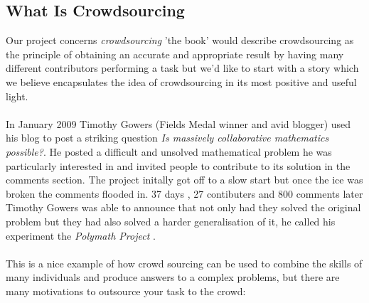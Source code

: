 \documentclass[11pt]{article}
\begin{document}
\subsection{What Is Crowdsourcing} %
Our project concerns \emph{crowdsourcing} 'the book' would describe crowdsourcing as the principle of obtaining an accurate 
and appropriate result by having many different contributors performing a task but we'd like to start with a story which
we believe encapsulates the idea of crowdsourcing in its most positive and useful light.
\\
\\
In January 2009 Timothy Gowers (Fields Medal winner and avid blogger) used his blog to post a striking question \emph{Is massively 
collaborative mathematics possible?}. He posted a difficult and unsolved mathematical problem he was particularly interested in and invited 
people to contribute to its solution in the comments section. The project initally got off to a slow start but once the ice was broken the 
comments flooded in. 37 days , 27 contibuters and 800 comments later Timothy Gowers was able to announce that not only had they solved the 
original problem but they had also solved a harder generalisation of it, he called his experiment the \emph{Polymath Project} .
\\
\\
This is a nice example of how crowd sourcing can be used to combine the skills of many individuals and produce answers to a complex problems,
but there are many motivations to outsource your task to the crowd:
\end{document}
